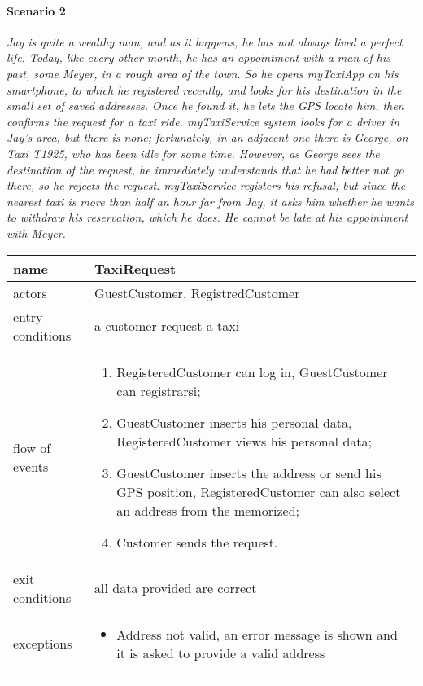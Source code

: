 	\paragraph{Scenario 2}\begin{fullwidth}\small\itshape Jay is quite a wealthy man, and as it happens, he has not always lived a perfect life. Today, like every other month, he has an appointment with a man of his past, some Meyer, in a rough area of the town. So he opens myTaxiApp on his smartphone, to which he registered recently, and looks for his destination in the small set of saved addresses. Once he found it, he lets the GPS locate him, then confirms the request for a taxi ride. myTaxiService system looks for a driver in Jay’s area, but there is none; fortunately, in an adjacent one there is George, on Taxi T1925, who has been idle for some time. However, as George sees the destination of the request, he immediately understands that he had better not go there, so he rejects the request. myTaxiService registers his refusal, but since the nearest taxi is more than half an hour far from Jay, it asks him whether he wants to withdraw his reservation, which he does. He cannot be late at his appointment with Meyer.\end{fullwidth}
	
	
	\begin{fullwidth}
		\begin{tabular}{ l p{} }
	\toprule
	name	&	TaxiRequest
	\\ \midrule
	actors	&	GuestCustomer, RegistredCustomer
	\\ \midrule
	entry conditions & a customer request a taxi
	\\ \midrule
	flow of events & \begin{enumerate}
	
		\item RegisteredCustomer can log in, GuestCustomer can registrarsi;
		\item GuestCustomer inserts his personal data, RegisteredCustomer views his personal data;
		\item GuestCustomer inserts the address or send his GPS position, RegisteredCustomer can also select an address from the memorized;
		\item Customer sends the request.
	
	\end{enumerate}\\ \midrule
	exit conditions	&	 all data provided are correct
	\\ \midrule
	exceptions & \begin{itemize}
		
		\item Address not valid, an error message is shown and it is asked to provide a valid address
	
	\end{itemize}\\ \bottomrule
\end{tabular}
	\end{fullwidth}





